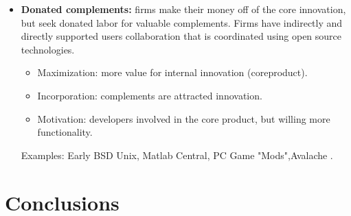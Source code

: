 \begin{itemize}
 \item \textbf{Donated complements:} firms make their money off of the core innovation, but seek donated labor for valuable complements. Firms have indirectly and directly supported users collaboration that is coordinated using open source technologies.

	\begin{itemize}
		\item Maximization: more value for internal innovation (coreproduct).
		\item Incorporation: complements are attracted innovation.
		\item Motivation: developers involved in the core product, but willing more functionality.
	\end{itemize}
Examples: Early BSD Unix, Matlab Central, PC Game "Mods",Avalache .
\end{itemize}


 


\section{Conclusions}\label{conclusions}
